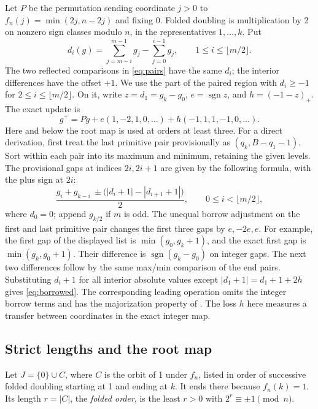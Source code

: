 \documentclass[11pt,reqno]{amsart}
\theoremstyle{remark}
\newcommand{\sgn}{\operatorname{sgn}}
\begin{document}
Let \(P\) be the permutation sending coordinate \(j>0\) to
\(f_n(j)=\min(2j,n-2j)\) and fixing \(0\). Folded doubling is
multiplication by 2 on nonzero sign classes modulo \(n\), in the
representatives \(1,\ldots,k\). Put
\[
 d_i(g)=\sum_{j=m-i}^{m-1}g_j-\sum_{j=0}^{i-1}g_j,
 \qquad 1\le i\le\lfloor m/2\rfloor .
\]
The two reflected comparisons in \eqref{eq:pairs} have the same
\(d_i\); the interior differences have the offset \(+1\).
We use the part of the paired region with
\(d_i\ge -1\) for \(2\le i\le\lfloor m/2\rfloor\).
On it, write \(z=d_1=g_k-g_0\), \(e=\sgn z\), and \(h=(-1-z)_+\).
The exact update is
\begin{equation}\label{eq:borrowed}
      g^+=Pg+e(1,-2,1,0,\ldots)+h(-1,1,1,-1,0,\ldots).
\end{equation}
Here and below the root map is used at orders at least three.
For a direct derivation, first treat the last primitive pair
provisionally as \((q_k,B-q_1-1)\). Sort within each pair into its
maximum and minimum, retaining the given levels. The provisional gaps
at indices \(2i,2i+1\) are given by the following formula, with the
plus sign at \(2i\):
\begin{equation}\label{eq:maxmin}
 \frac{g_i+g_{k-i}\ \pm\bigl( |d_i+1|-|d_{i+1}+1|\bigr)}2 ,
 \qquad 0\le i<\lfloor m/2\rfloor ,
\end{equation}
where \(d_0=0\); append \(g_{k/2}\) if \(m\) is odd. The unequal
borrow adjustment on the first and last primitive pair changes
the first three gaps by \(e,-2e,e\).
For example, the first gap of the displayed list is
\(\min(g_0,g_k+1)\), and the exact first gap is
\(\min(g_k,g_0+1)\). Their difference is \(\sgn(g_k-g_0)\) on
integer gaps. The next two differences follow by the same
max/min comparison of the end pairs. Substituting \(d_i+1\)
for all interior absolute values except \( |d_1+1|=d_1+1+2h\)
gives \eqref{eq:borrowed}. The corresponding leading operation
omits the integer borrow terms and has the majorization property
of \cite[Theorem~1]{G4}. The loss \(h\) here measures a transfer
between coordinates in the exact integer map.

\subsection{Strict lengths and the root map}

Let \(J=\{0\}\cup C\), where \(C\) is the orbit of 1 under \(f_n\),
listed in order of successive folded doubling starting at 1 and
ending at \(k\). It ends there because \(f_n(k)=1\). Its length
\(r=|C|\), the \emph{folded order}, is the least \(r>0\) with
\(2^r\equiv\pm1\pmod n\).
\end{document}
